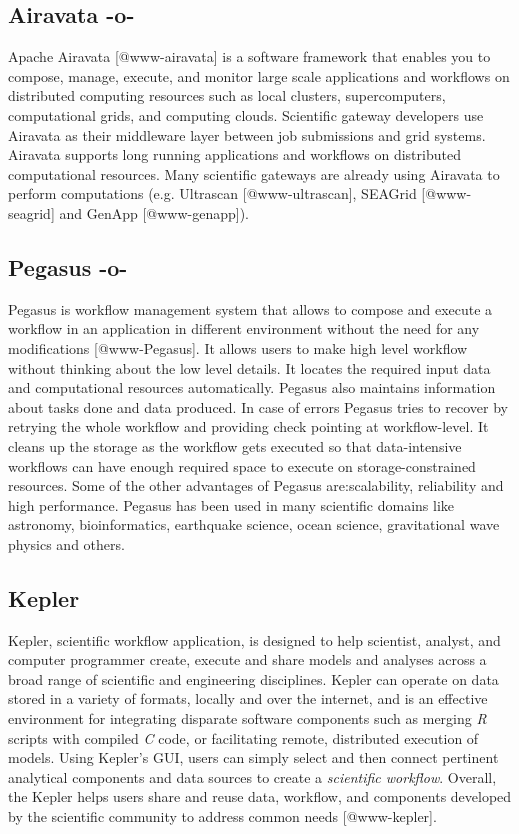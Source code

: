 \subsection{Airavata -o-}

Apache Airavata [@www-airavata] is a software framework that
enables you to compose, manage, execute, and monitor large scale
applications and workflows on distributed computing resources such as
local clusters, supercomputers, computational grids, and computing
clouds. Scientific gateway developers use Airavata as their middleware
layer between job submissions and grid systems. Airavata supports long
running applications and workflows on distributed computational
resources. Many scientific gateways are already using Airavata to
perform computations (e.g. Ultrascan [@www-ultrascan],
SEAGrid [@www-seagrid] and GenApp [@www-genapp]).



\subsection{Pegasus -o-}

Pegasus is workflow management system that allows to compose and
execute a workflow in an application in different environment without
the need for any modifications [@www-Pegasus]. It allows users to
make high level workflow without thinking about the low level
details. It locates the required input data and computational
resources automatically.  Pegasus also maintains information about
tasks done and data produced. In case of errors Pegasus tries to
recover by retrying the whole workflow and providing check pointing at
workflow-level.  It cleans up the storage as the workflow gets
executed so that data-intensive workflows can have enough required
space to execute on storage-constrained resources. Some of the other
advantages of Pegasus are:scalability, reliability and high
performance. Pegasus has been used in many scientific domains like
astronomy, bioinformatics, earthquake science, ocean science,
gravitational wave physics and others.




\subsection{Kepler}
 
Kepler, scientific workflow application, is designed to help
scientist, analyst, and computer programmer create, execute and share
models and analyses across a broad range of scientific and engineering
disciplines.  Kepler can operate on data stored in a variety of
formats, locally and over the internet, and is an effective
environment for integrating disparate software components such as
merging \textit{R} scripts with compiled \textit{C} code, or facilitating remote,
distributed execution of models. Using Kepler's GUI, users can simply
select and then connect pertinent analytical components and data
sources to create a \textit{scientific workflow}. Overall, the Kepler helps
users share and reuse data, workflow, and components developed by the
scientific community to address common needs [@www-kepler].

